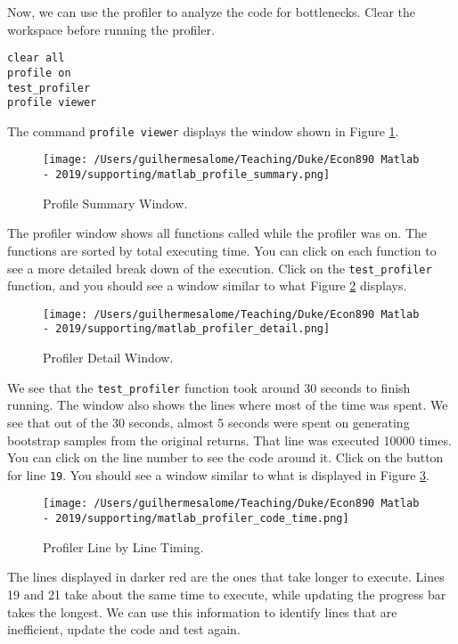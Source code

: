 \documentclass[12pt, a4paper]{article}
\begin{document}
Now, we can use the profiler to analyze the code for bottlenecks.
Clear the workspace before running the profiler.
\lstset{language=matlab,label= ,caption= ,captionpos=b,firstnumber=1,numbers=left,style=Matlab-editor}
\begin{lstlisting}
clear all
profile on
test_profiler
profile viewer
\end{lstlisting}

The command \texttt{profile viewer} displays the window shown in Figure \ref{fig:org8fa407f}.

\begin{figure}[H]
\centering
\texttt{[image: /Users/guilhermesalome/Teaching/Duke/Econ890 Matlab - 2019/supporting/matlab\_profile\_summary.png]}
\caption{\label{fig:org8fa407f}
Profile Summary Window.}
\end{figure}

The profiler window shows all functions called while the profiler was on.
The functions are sorted by total executing time.
You can click on each function to see a more detailed break down of the execution.
Click on the \texttt{test\_profiler} function, and you should see a window similar to what Figure \ref{fig:orge708250} displays.

\begin{figure}[H]
\centering
\texttt{[image: /Users/guilhermesalome/Teaching/Duke/Econ890 Matlab - 2019/supporting/matlab\_profiler\_detail.png]}
\caption{\label{fig:orge708250}
Profiler Detail Window.}
\end{figure}

We see that the \texttt{test\_profiler} function took around 30 seconds to finish running.
The window also shows the lines where most of the time was spent.
We see that out of the 30 seconds, almost 5 seconds were spent on generating bootstrap samples from the original returns.
That line was executed 10000 times.
You can click on the line number to see the code around it.
Click on the button for line \texttt{19}.
You should see a window similar to what is displayed in Figure \ref{fig:org2723441}.

\begin{figure}[H]
\centering
\texttt{[image: /Users/guilhermesalome/Teaching/Duke/Econ890 Matlab - 2019/supporting/matlab\_profiler\_code\_time.png]}
\caption{\label{fig:org2723441}
Profiler Line by Line Timing.}
\end{figure}

The lines displayed in darker red are the ones that take longer to execute.
Lines 19 and 21 take about the same time to execute, while updating the progress bar takes the longest.
We can use this information to identify lines that are inefficient, update the code and test again.
\end{document}
